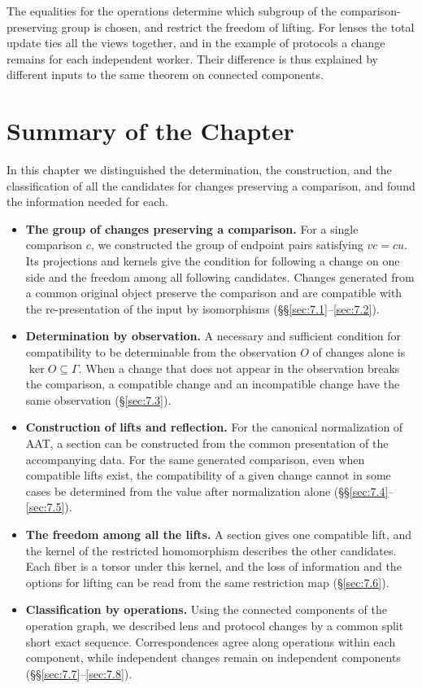 The equalities for the operations determine which subgroup of the comparison-preserving
group is chosen, and restrict the freedom of lifting.
For lenses the total update ties all the views together, and in the example of protocols a
change remains for each independent worker.
Their difference is thus explained by different inputs to the same theorem on connected components.

\section*{Summary of the Chapter}

In this chapter we distinguished the determination, the construction, and the classification
of all the candidates for changes preserving a comparison, and found the information needed
for each.

\begin{itemize}
\item \textbf{The group of changes preserving a comparison.} For a single comparison $c$, we
constructed the group of endpoint pairs satisfying $vc=cu$.
Its projections and kernels give the condition for following a change on one side
and the freedom among all following candidates.
Changes generated from a common original object preserve the comparison and are compatible
with the re-presentation of the input by isomorphisms
(\S\S\ref{sec:7.1}--\ref{sec:7.2}).
\item \textbf{Determination by observation.} A necessary and sufficient condition for
compatibility to be determinable from the observation $O$ of changes alone is
$\ker O\subseteq\Gamma$.
When a change that does not appear in the observation breaks the comparison, a compatible
change and an incompatible change have the same observation (\S\ref{sec:7.3}).
\item \textbf{Construction of lifts and reflection.} For the canonical normalization of AAT,
a section can be constructed from the common presentation of the accompanying data.
For the same generated comparison, even when compatible lifts exist, the compatibility of a
given change cannot in some cases be determined from the value after normalization alone
(\S\S\ref{sec:7.4}--\ref{sec:7.5}).
\item \textbf{The freedom among all the lifts.} A section gives one compatible lift, and the
kernel of the restricted homomorphism describes the other candidates.
Each fiber is a torsor under this kernel, and the loss of information and the options for
lifting can be read from the same restriction map (\S\ref{sec:7.6}).
\item \textbf{Classification by operations.} Using the connected components of the
operation graph, we described lens and protocol changes by a common split short exact
sequence. Correspondences agree along operations within each component, while independent
changes remain on independent components (\S\S\ref{sec:7.7}--\ref{sec:7.8}).
\end{itemize}

